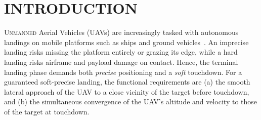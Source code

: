 \documentclass{IEEEtaes}
\begin{document}

\section{INTRODUCTION} \label{intro: section}
U{\scshape nmanned} Aerial Vehicles (UAVs) are increasingly tasked with autonomous landings on mobile platforms such as ships and ground vehicles~\cite{lin2022, herisse2012, paris2020, bouazza2025, singhal2025}. An imprecise landing risks missing the platform entirely or grazing its edge, while a hard landing risks airframe and payload damage on contact. Hence, the terminal landing phase demands both \emph{precise} positioning and a \emph{soft} touchdown. For a guaranteed soft-precise landing, the functional requirements are (a) the smooth lateral approach of the UAV to a close vicinity of the target before touchdown, and (b) the simultaneous convergence of the UAV's altitude and velocity to those of the target at touchdown.
\end{document}
